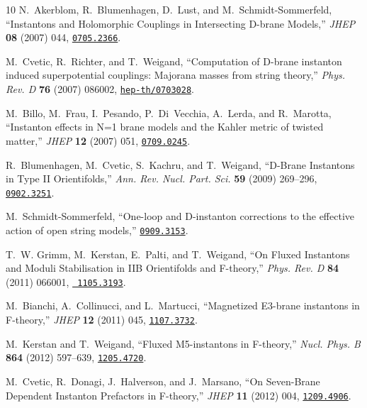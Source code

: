 \documentclass[12pt,a4paper]{article}
\begin{document}
\begin{thebibliography}{10}
	N.~Akerblom, R.~Blumenhagen, D.~Lust, and M.~Schmidt-Sommerfeld, ``{Instantons
		and Holomorphic Couplings in Intersecting D-brane Models},'' {\em JHEP} {\bf
		08} (2007) 044, \href{http://www.arXiv.org/abs/0705.2366}{{\tt 0705.2366}}.
	
	M.~Cvetic, R.~Richter, and T.~Weigand, ``{Computation of D-brane instanton
		induced superpotential couplings: Majorana masses from string theory},'' {\em
		Phys. Rev. D} {\bf 76} (2007) 086002,
	\href{http://www.arXiv.org/abs/hep-th/0703028}{{\tt hep-th/0703028}}.
	
	M.~Billo, M.~Frau, I.~Pesando, P.~Di~Vecchia, A.~Lerda, and R.~Marotta,
	``{Instanton effects in N=1 brane models and the Kahler metric of twisted
		matter},'' {\em JHEP} {\bf 12} (2007) 051,
	\href{http://www.arXiv.org/abs/0709.0245}{{\tt 0709.0245}}.
	
	R.~Blumenhagen, M.~Cvetic, S.~Kachru, and T.~Weigand, ``{D-Brane Instantons in
		Type II Orientifolds},'' {\em Ann. Rev. Nucl. Part. Sci.} {\bf 59} (2009)
	269--296, \href{http://www.arXiv.org/abs/0902.3251}{{\tt 0902.3251}}.
	
	M.~Schmidt-Sommerfeld, ``{One-loop and D-instanton corrections to the effective
		action of open string models},''
	\href{http://www.arXiv.org/abs/0909.3153}{{\tt 0909.3153}}.
	
	T.~W. Grimm, M.~Kerstan, E.~Palti, and T.~Weigand, ``{On Fluxed Instantons and
		Moduli Stabilisation in IIB Orientifolds and F-theory},'' {\em Phys. Rev. D}
	{\bf 84} (2011) 066001, \href{http://www.arXiv.org/abs/1105.3193}{{\tt
			1105.3193}}.
	
	M.~Bianchi, A.~Collinucci, and L.~Martucci, ``{Magnetized E3-brane instantons
		in F-theory},'' {\em JHEP} {\bf 12} (2011) 045,
	\href{http://www.arXiv.org/abs/1107.3732}{{\tt 1107.3732}}.
	
	M.~Kerstan and T.~Weigand, ``{Fluxed M5-instantons in F-theory},'' {\em Nucl.
		Phys. B} {\bf 864} (2012) 597--639,
	\href{http://www.arXiv.org/abs/1205.4720}{{\tt 1205.4720}}.
	
	M.~Cvetic, R.~Donagi, J.~Halverson, and J.~Marsano, ``{On Seven-Brane Dependent
		Instanton Prefactors in F-theory},'' {\em JHEP} {\bf 11} (2012) 004,
	\href{http://www.arXiv.org/abs/1209.4906}{{\tt 1209.4906}}.
	

\end{thebibliography}
\end{document}
